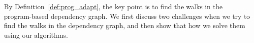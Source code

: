 By Definition~\ref{def:prog_adapt}, the key point is to find the walks in the program-based dependency graph. 
We first discuss two challenges when we try to find the walks in the dependency graph, and then show that how we solve them using our algorithms.


